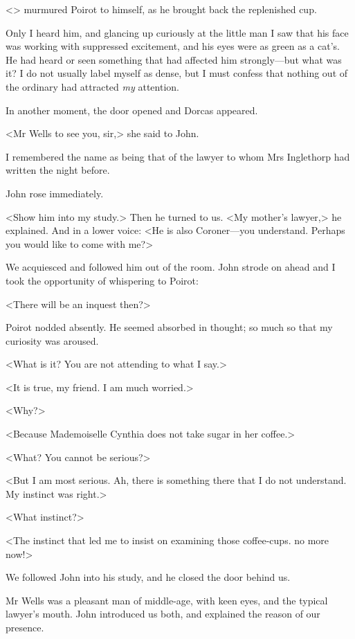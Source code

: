  <> murmured Poirot to himself, as he brought back the replenished cup. 

 Only I heard him, and glancing up curiously at the little man I saw that his face was working with suppressed excitement, and his eyes were as green as a cat's. He had heard or seen something that had affected him strongly—but what was it? I do not usually label myself as dense, but I must confess that nothing out of the ordinary had attracted \emph{my} attention. 

 In another moment, the door opened and Dorcas appeared. 

 <Mr Wells to see you, sir,> she said to John. 

 I remembered the name as being that of the lawyer to whom Mrs Inglethorp had written the night before. 

 John rose immediately. 

 <Show him into my study.> Then he turned to us. <My mother's lawyer,> he explained. And in a lower voice: <He is also Coroner—you understand. Perhaps you would like to come with me?> 

 We acquiesced and followed him out of the room. John strode on ahead and I took the opportunity of whispering to Poirot: 

 <There will be an inquest then?> 

 Poirot nodded absently. He seemed absorbed in thought; so much so that my curiosity was aroused. 

 <What is it? You are not attending to what I say.> 

 <It is true, my friend. I am much worried.> 

 <Why?> 

 <Because Mademoiselle Cynthia does not take sugar in her coffee.> 

 <What? You cannot be serious?> 

 <But I am most serious. Ah, there is something there that I do not understand. My instinct was right.> 

 <What instinct?> 

 <The instinct that led me to insist on examining those coffee-cups.  no more now!> 

 We followed John into his study, and he closed the door behind us. 

 Mr Wells was a pleasant man of middle-age, with keen eyes, and the typical lawyer's mouth. John introduced us both, and explained the reason of our presence. 


